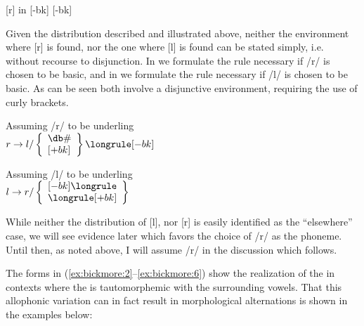 \documentclass[output=paper,modfonts,nonflat,
 hidelinks
]{langsci/langscibook}
\begin{document}
\ea\label{ex:bickmore:7}
[r] in  [-bk] \underline{ }\underline{ } [-bk]
\ea\label{ex:bickmore:7a}
\ex\label{ex:bickmore:7b}
\ex\label{ex:bickmore:7c}
\ex\label{ex:bickmore:7d}
\z
\z

Given the distribution described and illustrated above, neither the environment where [r] is found, nor the one where [l] is found can be stated simply, i.e. without recourse to disjunction. In  we formulate the rule necessary if /r/ is chosen to be basic, and in  we formulate the rule necessary if /l/ is chosen to be basic. As can be seen both involve a disjunctive environment, requiring the use of curly brackets. 


\ea\label{ex:bickmore:8}
Assuming /r/ to be underling    \\
$r\to l/
\left\{
\begin{array}{l}
{\db}\#\\{}
[+bk]
\end{array}
\right\}
{\longrule}
[-bk]
$


 
 \z

\ea\label{ex:bickmore:9}
Assuming /l/ to be underling\\
$l\to r/
\left\{
\begin{array}{l}
[-bk]{\longrule}\\
{\longrule}[+bk]
\end{array}
\right\} 
$

 
 
\z


 

While neither the distribution of [l], nor [r] is easily identified as the “elsewhere” case, we will see evidence later which favors the choice of /r/ as the phoneme. Until then, as noted above, I will assume /r/ in the discussion which follows. 

The forms in (\ref{ex:bickmore:2}--\ref{ex:bickmore:6}) show the realization of the  in contexts where the  is tautomorphemic with the surrounding vowels. That this allophonic variation can in fact result in morphological alternations is shown in the examples below:
\end{document}
